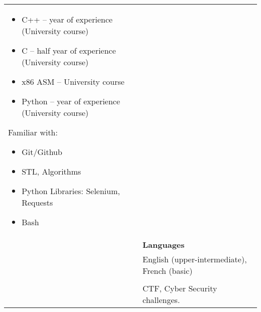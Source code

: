 \documentclass[letterpaper, 11pt]{article}
\begin{document}
\begin{longtable}{p{1.3in}p{4.8in}}
\begin{itemize}[noitemsep, leftmargin=*]
    \item C++ -- year of experience (University course)
    \item C -- half year of experience (University course)
    \item x86 ASM -- University course
    \item Python -- year of experience (University course)
\end{itemize}
Familiar with: 
\begin{itemize}
    \item Git/Github
    \item STL, Algorithms
    \item Python Libraries: Selenium, Requests
    \item Bash
\end{itemize}
\\
& \textbf{Languages} \\
& English (upper-intermediate), French (basic) \\
& \\




\nohyphens{\color{OliveGreen}{Other interests}} & CTF, Cyber Security challenges.\\


\end{longtable}
\end{document}
